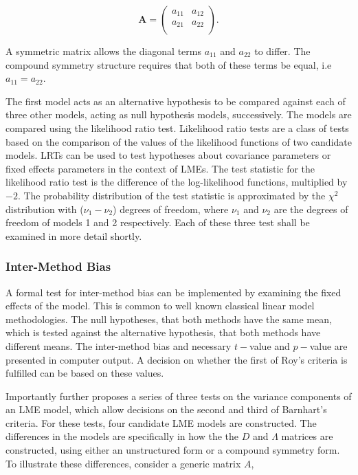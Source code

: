 \documentclass[12pt, a4paper]{report}
\theoremstyle{plain}
\theoremstyle{definition}
\theoremstyle{remark}
\begin{document}
	\[
	\boldsymbol{A} = \left( \begin{array}{cc}
	a_{11} & a_{12}  \\
	a_{21} & a_{22}  \\
	\end{array}\right).
	\]
	
	A symmetric matrix allows the diagonal terms $a_{11}$ and $a_{22}$ to differ. The compound symmetry structure requires that both of these terms be equal, i.e $a_{11} = a_{22}$.
	
	The first model acts as an alternative hypothesis to be compared against each of three other models, acting as null hypothesis models, successively. The models are compared using the likelihood ratio test. Likelihood ratio tests are a class of tests based on the comparison of the values of the likelihood functions of two candidate models. LRTs can be used to test hypotheses about covariance parameters or fixed effects parameters in the context of LMEs. The test statistic for the likelihood ratio test is the difference of the log-likelihood functions, multiplied by $-2$.
	The probability distribution of the test statistic is approximated by the $\chi^2$ distribution with ($\nu_{1} - \nu_{2}$) degrees of freedom, where $\nu_{1}$ and $\nu_{2}$ are the degrees of freedom of models 1 and 2 respectively. Each of these three test shall be examined in more detail shortly.
	

	
	\subsubsection{Inter-Method Bias}
	
	
	A formal test for inter-method bias can be implemented by examining the fixed effects of the model. This is common to well known classical linear model methodologies. The null hypotheses, that both methods have the same mean, which is tested against the alternative hypothesis, that both methods have different means.
	The inter-method bias and necessary $t-$value and $p-$value are presented in computer output. A decision on whether the first of Roy's criteria is fulfilled can be based on these values.
	
	Importantly \citet{ARoy2009} further proposes a series of three tests on the variance components of an LME model, which allow decisions on the second and third of Barnhart's criteria. For these tests, four candidate LME models are constructed. The differences in the models are specifically in how the the $D$ and $\Lambda$ matrices are constructed, using either an unstructured form or a compound symmetry form. To illustrate these differences, consider a generic matrix $A$,
	
\end{document}
